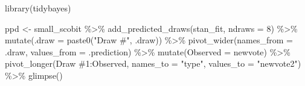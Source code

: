 \documentclass[
]{book}
\newenvironment{Shaded}{\begin{snugshade}}{\end{snugshade}}
\newcommand{\AttributeTok}[1]{\textcolor[rgb]{0.77,0.63,0.00}{#1}}
\newcommand{\DecValTok}[1]{\textcolor[rgb]{0.00,0.00,0.81}{#1}}
\newcommand{\FunctionTok}[1]{\textcolor[rgb]{0.00,0.00,0.00}{#1}}
\newcommand{\NormalTok}[1]{#1}
\newcommand{\OtherTok}[1]{\textcolor[rgb]{0.56,0.35,0.01}{#1}}
\newcommand{\SpecialCharTok}[1]{\textcolor[rgb]{0.00,0.00,0.00}{#1}}
\newcommand{\StringTok}[1]{\textcolor[rgb]{0.31,0.60,0.02}{#1}}
\begin{document}
\begin{Shaded}
\begin{Highlighting}[]
\FunctionTok{library}\NormalTok{(tidybayes)}

\NormalTok{ppd }\OtherTok{\textless{}{-}}\NormalTok{ small\_scobit }\SpecialCharTok{\%\textgreater{}\%}
  \FunctionTok{add\_predicted\_draws}\NormalTok{(stan\_fit, }\AttributeTok{ndraws =} \DecValTok{8}\NormalTok{) }\SpecialCharTok{\%\textgreater{}\%}
  \FunctionTok{mutate}\NormalTok{(}\AttributeTok{.draw =} \FunctionTok{paste0}\NormalTok{(}\StringTok{"Draw \#"}\NormalTok{, .draw)) }\SpecialCharTok{\%\textgreater{}\%} 
  \FunctionTok{pivot\_wider}\NormalTok{(}\AttributeTok{names\_from =}\NormalTok{ .draw, }\AttributeTok{values\_from =}\NormalTok{ .prediction) }\SpecialCharTok{\%\textgreater{}\%}
  \FunctionTok{mutate}\NormalTok{(}\StringTok{\textasciigrave{}}\AttributeTok{Observed}\StringTok{\textasciigrave{}} \OtherTok{=}\NormalTok{ newvote) }\SpecialCharTok{\%\textgreater{}\%} 
  \FunctionTok{pivot\_longer}\NormalTok{(}\StringTok{\textasciigrave{}}\AttributeTok{Draw \#1}\StringTok{\textasciigrave{}}\SpecialCharTok{:}\StringTok{\textasciigrave{}}\AttributeTok{Observed}\StringTok{\textasciigrave{}}\NormalTok{, }\AttributeTok{names\_to =} \StringTok{"type"}\NormalTok{, }\AttributeTok{values\_to =} \StringTok{"newvote2"}\NormalTok{) }\SpecialCharTok{\%\textgreater{}\%}
  \FunctionTok{glimpse}\NormalTok{()}
\end{Highlighting}
\end{Shaded}
\end{document}
